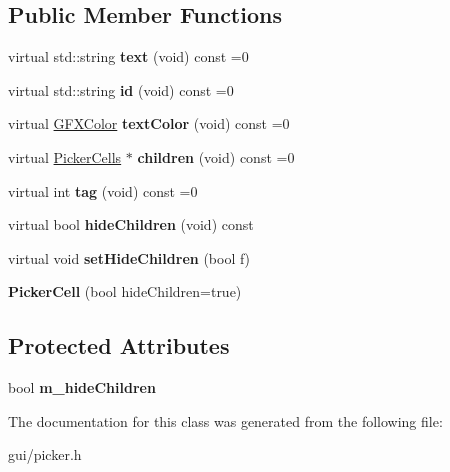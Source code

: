 \subsection*{Public Member Functions}
\begin{DoxyCompactItemize}
\item 
virtual std\+::string {\bfseries text} (void) const =0\hypertarget{classPickerCell_aa7b9a3f1876a3707bc3c8677a154858e}{}\label{classPickerCell_aa7b9a3f1876a3707bc3c8677a154858e}

\item 
virtual std\+::string {\bfseries id} (void) const =0\hypertarget{classPickerCell_a156e28013a699e9fa0b08a3c6521ffa0}{}\label{classPickerCell_a156e28013a699e9fa0b08a3c6521ffa0}

\item 
virtual \hyperlink{structGFXColor}{G\+F\+X\+Color} {\bfseries text\+Color} (void) const =0\hypertarget{classPickerCell_a71d1b210c6e86276c459400f4f465079}{}\label{classPickerCell_a71d1b210c6e86276c459400f4f465079}

\item 
virtual \hyperlink{classPickerCells}{Picker\+Cells} $\ast$ {\bfseries children} (void) const =0\hypertarget{classPickerCell_a5dd9b5b93b9e0722bedee8bd6ab0b22a}{}\label{classPickerCell_a5dd9b5b93b9e0722bedee8bd6ab0b22a}

\item 
virtual int {\bfseries tag} (void) const =0\hypertarget{classPickerCell_a9190b616d95849f9f79afe93a0b3ed98}{}\label{classPickerCell_a9190b616d95849f9f79afe93a0b3ed98}

\item 
virtual bool {\bfseries hide\+Children} (void) const \hypertarget{classPickerCell_ab2142280ad15c0906df6bb49cf715b3f}{}\label{classPickerCell_ab2142280ad15c0906df6bb49cf715b3f}

\item 
virtual void {\bfseries set\+Hide\+Children} (bool f)\hypertarget{classPickerCell_adefd8665b5cea215eb142acb4e38c211}{}\label{classPickerCell_adefd8665b5cea215eb142acb4e38c211}

\item 
{\bfseries Picker\+Cell} (bool hide\+Children=true)\hypertarget{classPickerCell_a603de61374f7b0c301381cba0bc5fd1e}{}\label{classPickerCell_a603de61374f7b0c301381cba0bc5fd1e}

\end{DoxyCompactItemize}
\subsection*{Protected Attributes}
\begin{DoxyCompactItemize}
\item 
bool {\bfseries m\+\_\+hide\+Children}\hypertarget{classPickerCell_acc79d71f619a16bfb63e8164f727cf90}{}\label{classPickerCell_acc79d71f619a16bfb63e8164f727cf90}

\end{DoxyCompactItemize}


The documentation for this class was generated from the following file\+:\begin{DoxyCompactItemize}
\item 
gui/picker.\+h\end{DoxyCompactItemize}
